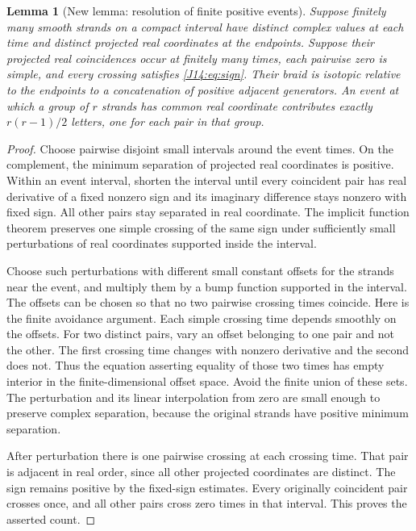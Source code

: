 \documentclass[11pt,oneside]{report}
\newtheorem{lemma}[theorem]{Lemma}
\theoremstyle{definition}
\numberwithin{equation}{section}
\begin{document}
\begin{lemma}[New lemma: resolution of finite positive events]
\label{J14:lem:events}
Suppose finitely many smooth strands on a compact interval have distinct
complex values at each time and distinct projected real coordinates at the
endpoints. Suppose their projected real coincidences occur at finitely many
times, each pairwise zero is simple, and every crossing satisfies
\eqref{J14:eq:sign}. Their braid is isotopic relative to the endpoints to a
concatenation of positive adjacent generators. An event at which a group of
$r$ strands has common real coordinate contributes exactly $r(r-1)/2$
letters, one for each pair in that group.
\end{lemma}
\begin{proof}
Choose pairwise disjoint small intervals around the event times.
On the complement, the minimum separation of projected real coordinates is
positive. Within an event interval, shorten the interval until every
coincident pair has real derivative of a fixed nonzero sign and its imaginary
difference stays nonzero with fixed sign. All other pairs stay separated in
real coordinate. The implicit function theorem preserves one simple crossing
of the same sign under sufficiently small perturbations of real coordinates
supported inside the interval.

Choose such perturbations with different small constant offsets for the
strands near the event, and multiply them by a bump function supported in
the interval. The offsets can be chosen so that no two pairwise crossing
times coincide. Here is the finite avoidance argument. Each simple crossing
time depends smoothly on the offsets. For two distinct pairs, vary an offset
belonging to one pair and not the other. The first crossing time changes with
nonzero derivative and the second does not. Thus the equation asserting
equality of those two times has empty interior in the finite-dimensional
offset space. Avoid the finite union of these sets. The perturbation and its
linear interpolation from zero are small enough to preserve complex
separation, because the original strands have positive minimum separation.

After perturbation there is one pairwise crossing at each crossing time.
That pair is adjacent in real order, since all other projected coordinates
are distinct. The sign remains positive by the fixed-sign estimates.
Every originally coincident pair crosses once, and all other pairs cross
zero times in that interval. This proves the asserted count.


\end{proof}
\end{document}
